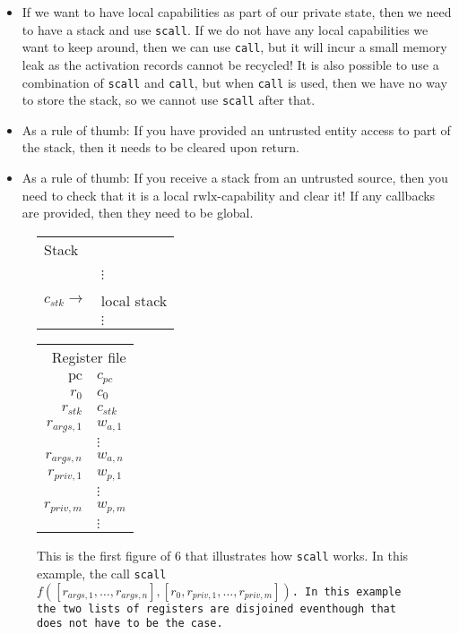 \documentclass[a4paper]{article}
\newcommand{\var}[1]{\mathit{#1}}
\newcommand{\pc}{\mathit{pc}}
\newcommand{\pcreg}{\mathrm{pc}}
\newcommand{\plainperm}[1]{\mathrm{#1}}
\newcommand{\rwlx}{\plainperm{rwlx}}
\begin{document}
\begin{itemize}
\item If we want to have local capabilities as part of our private state, then we need to have a stack and use \texttt{scall}. If we do not have any local capabilities we want to keep around, then we can use \texttt{call}, but it will incur a small memory leak as the activation records cannot be recycled! It is also possible to use a combination of \texttt{scall} and \texttt{call}, but when \texttt{call} is used, then we have no way to store the stack, so we cannot use \texttt{scall} after that.
\item As a rule of thumb: If you have provided an untrusted entity access to part of the stack, then it needs to be cleared upon return.
\item As a rule of thumb: If you receive a stack from an untrusted source, then you need to check that it is a local $\rwlx$-capability and clear it! If any callbacks are provided, then they need to be global.
\end{itemize}
\begin{figure}
  \label{fig:stack-before-call}
  \centering
  \begin{tabular}[!h]{r | >{\raggedright\arraybackslash}p{3cm} |}
\multicolumn{2}{l}{Stack} \\
\cline{2-2}
   & \\
   & $\vdots$\\
\cline{2-2}
   & 0 \\
\cline{2-2}
$c_{\var{stk}} \rightarrow$   & local stack\\
   & $\vdots$\\
\cline{2-2}
\end{tabular}
\hspace{1cm}
\begin{tabular}{r | >{\centering\arraybackslash}p{0.75cm} |}
\multicolumn{2}{r}{Register file} \\
\cline{2-2}
$\pcreg$ & $c_{\pc}$\\
\cline{2-2}
$r_0$  & $c_0$ \\
\cline{2-2}
$r_{\var{stk}}$  & $c_{\var{stk}}$ \\
\cline{2-2}
$r_{\var{args},1}$ & $w_{a,1}$ \\
\cline{2-2}
& $\vdots$ \\
\cline{2-2}
$r_{\var{args},n}$ & $w_{a,n}$\\
\cline{2-2}
$r_{\var{priv},1}$ & $w_{p,1}$\\
\cline{2-2}
& $\vdots$ \\
\cline{2-2}
$r_{\var{priv},m}$ & $w_{p,m}$\\
\cline{2-2}
& $\vdots$ \\
\cline{2-2}
\end{tabular}
\caption{This is the first figure of 6 that illustrates how \texttt{scall} works. In this example, the call \texttt{scall $f([r_{\var{args},1},\dots,r_{\var{args},n}],[r_0,r_{\var{priv},1},\dots,r_{\var{priv},m}])$. In this example the two lists of registers are disjoined eventhough that does not have to be the case.}}
\end{figure}
\end{document}
